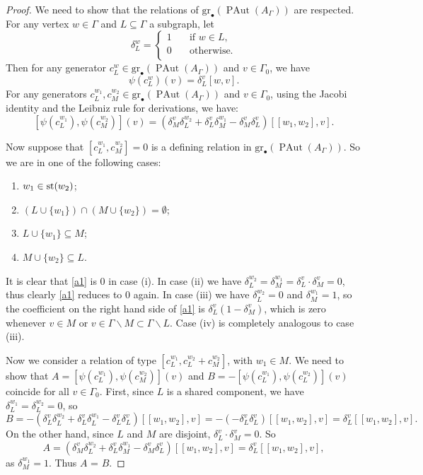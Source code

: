 \documentclass[10pt]{amsart}
\theoremstyle{definition}
\newcommand{\st}{{\rm st}}
\newcommand{\PAut}{\operatorname{PAut}}
\newcommand{\gr}{\mathrm{gr}_\bullet}
\theoremstyle{definition}
\numberwithin{equation}{section}
\begin{document}
  \begin{proof}
  We need to show that the relations of $\gr(\PAut(A_\Gamma))$ are respected. For any
  vertex $w \in \Gamma$ and $L \subseteq \Gamma$ a subgraph, let
  \[
\delta_L^w =
     \begin{cases}
       1  &\quad\text{if } w \in L,\\
       0  &\quad\text{otherwise.} \\
     \end{cases}
\]
Then for any generator $c_L^w \in \gr(\PAut(A_\Gamma))$ and $v \in \Gamma_0$, we have \[\psi ( c_L^w) (v) = \delta_L^v [w, v].\]
 For any generators $c_L^{w_1}, c_M^{w_2} \in \gr(\PAut(A_\Gamma))$ and $v \in \Gamma_0$, using the Jacobi identity and the Leibniz rule for derivations, we have:
 \begin{equation} \label{a1}
  [\psi(c_L^{w_1}), \psi(c_M^{w_2})] (v) = (\delta_M^v \delta_L^{w_2} + \delta_L^v \delta_M^{w_1} - \delta_M^v \delta_L^v)[[w_1,w_2],v].
 \end{equation}

 Now suppose that $[c_L^{w_1}, c_M^{w_2}]=0$ is a defining relation in $\gr(\PAut(A_\Gamma))$. So we are in one of the following cases:
 \begin{enumerate}
  \item[(i)] $w_1 \in \st(w_2)$;
  \item[(ii)] $(L \cup \{w_1\}) \cap (M \cup \{w_2\}) = \emptyset$;
  \item[(iii)] $L \cup \{w_1\} \subseteq M$;
  \item[(iv)] $M \cup \{w_2\} \subseteq L$.
 \end{enumerate}
 It is clear that \eqref{a1} is $0$ in case (i). In case (ii) we have $\delta_L^{w_2} = \delta_M^{w_1} = \delta_L^v \cdot \delta_M^v = 0$, thus clearly \eqref{a1} reduces to $0$ again. In case
 (iii) we have $\delta_L^{w_2}=0$ and $\delta_M^{w_1}=1$, so the coefficient on the right hand side of \eqref{a1} is
 $\delta_L^v (1- \delta_M^v)$, which is zero whenever $v \in M$ or $v \in \Gamma \smallsetminus M \subset \Gamma \smallsetminus L$. Case (iv) is completely analogous to case (iii).

 Now we consider a relation of type $[c_L^{w_1}, c_L^{w_2}+c_M^{w_2}]$, with $w_1 \in M$. We need to show that $A =[\psi(c_L^{w_1}), \psi(c_M^{w_2})](v)$
 and $B = -[\psi(c_L^{w_1}), \psi(c_L^{w_2})](v)$ coincide for all $v \in \Gamma_0$. First, since $L$ is a shared component, we have $\delta_L^{w_1} = \delta_L^{w_2} = 0$, so
 \[ B = -(\delta_L^v \delta_L^{w_2} + \delta_L^v \delta_L^{w_1} - \delta_L^v \delta_L^v)[[w_1,w_2],v] = -(-\delta_L^v \delta_L^v )[[w_1,w_2],v] = \delta_L^v[[w_1,w_2],v].\]
  On the other hand, since $L$ and $M$ are disjoint, $\delta_L^v \cdot \delta_M^v = 0$. So
\[ A = (\delta_M^v \delta_L^{w_2} + \delta_L^v \delta_M^{w_1} - \delta_M^v \delta_L^v)[[w_1,w_2],v] =\delta_L^v[[w_1,w_2],v],\]
as $\delta_M^{w_1} = 1$. Thus $A$ = $B$.
 \end{proof}
\end{document}
